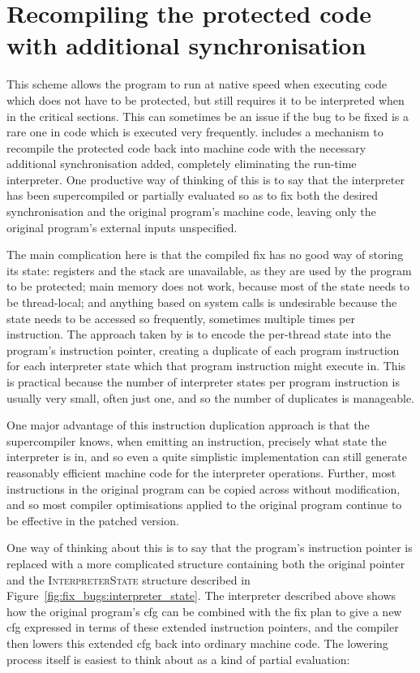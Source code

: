 \section{Recompiling the protected code with additional synchronisation}

This scheme allows the program to run at native speed when executing
code which does not have to be protected, but still requires it to be
interpreted when in the critical sections.  This can sometimes be an
issue if the bug to be fixed is a rare one in code which is executed
very frequently.  {\Implementation} includes a mechanism to recompile
the protected code back into machine code with the necessary
additional synchronisation added, completely eliminating the run-time
interpreter.  One productive way of thinking of this is to say that
the interpreter has been supercompiled\cite{Sorensen2008} or partially
evaluated\cite{Jones1993} so as to fix both the desired
synchronisation and the original program's machine code, leaving only
the original program's external inputs unspecified.

The main complication here is that the compiled fix has no good way of
storing its state: registers and the stack are unavailable, as they
are used by the program to be protected; main memory does not work,
because most of the state needs to be thread-local; and anything based
on system calls is undesirable because the state needs to be accessed
so frequently, sometimes multiple times per instruction.  The approach
taken by {\implementation} is to encode the per-thread state into the
program's instruction pointer, creating a duplicate of each program
instruction for each interpreter state which that program instruction
might execute in.  This is practical because the number of interpreter
states per program instruction is usually very small, often just one,
and so the number of duplicates is manageable.

One major advantage of this instruction duplication approach is that
the supercompiler knows, when emitting an instruction, precisely what
state the interpreter is in, and so even a quite simplistic
implementation can still generate reasonably efficient machine code
for the interpreter operations.  Further, most instructions in the
original program can be copied across without modification, and so
most compiler optimisations applied to the original program continue
to be effective in the patched version.

One way of thinking about this is to say that the program's
instruction pointer is replaced with a more complicated structure
containing both the original pointer and the \textsc{InterpreterState}
structure described in Figure~\ref{fig:fix_bugs:interpreter_state}.
The interpreter described above shows how the original program's \gls{cfg}
can be combined with the fix plan to give a new \gls{cfg} expressed in terms
of these extended instruction pointers, and the compiler then lowers
this extended \gls{cfg} back into ordinary machine code.  The lowering
process itself is easiest to think about as a kind of partial
evaluation:

